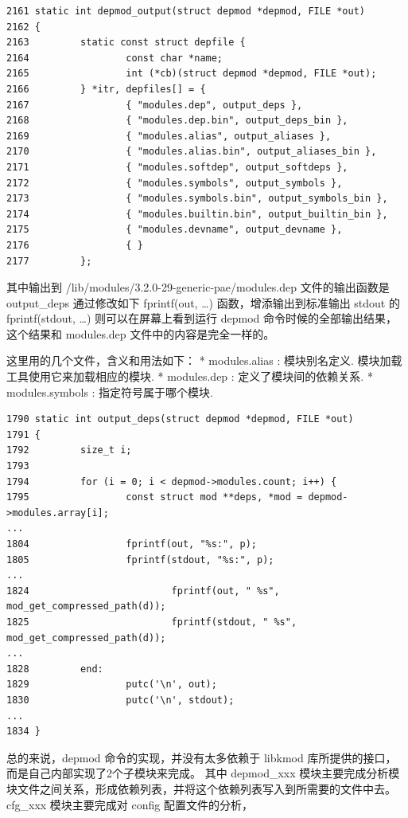 {\begin{shaded}\begin{verbatim}
2161 static int depmod_output(struct depmod *depmod, FILE *out)
2162 {
2163         static const struct depfile {
2164                 const char *name;
2165                 int (*cb)(struct depmod *depmod, FILE *out);
2166         } *itr, depfiles[] = {
2167                 { "modules.dep", output_deps },
2168                 { "modules.dep.bin", output_deps_bin },
2169                 { "modules.alias", output_aliases },
2170                 { "modules.alias.bin", output_aliases_bin },
2171                 { "modules.softdep", output_softdeps },
2172                 { "modules.symbols", output_symbols },
2173                 { "modules.symbols.bin", output_symbols_bin },
2174                 { "modules.builtin.bin", output_builtin_bin },
2175                 { "modules.devname", output_devname },
2176                 { }
2177         };
\end{verbatim}\end{shaded}}
其中输出到 /lib/modules/3.2.0-29-generic-pae/modules.dep
文件的输出函数是 output\_deps 通过修改如下 fprintf(out, \ldots{})
函数，增添输出到标准输出 stdout 的 fprintf(stdout, \ldots{})
则可以在屏幕上看到运行 depmod 命令时候的全部输出结果，这个结果和
modules.dep 文件中的内容是完全一样的。

这里用的几个文件，含义和用法如下： * modules.alias : 模块别名定义.
模块加载工具使用它来加载相应的模块. * modules.dep :
定义了模块间的依赖关系. * modules.symbols : 指定符号属于哪个模块.

{\begin{shaded}\begin{verbatim}
1790 static int output_deps(struct depmod *depmod, FILE *out)
1791 {
1792         size_t i;
1793 
1794         for (i = 0; i < depmod->modules.count; i++) {
1795                 const struct mod **deps, *mod = depmod->modules.array[i];
...
1804                 fprintf(out, "%s:", p);
1805                 fprintf(stdout, "%s:", p);
...
1824                         fprintf(out, " %s", mod_get_compressed_path(d));
1825                         fprintf(stdout, " %s", mod_get_compressed_path(d));
...
1828         end:
1829                 putc('\n', out);
1830                 putc('\n', stdout);
... 
1834 }
\end{verbatim}\end{shaded}}
总的来说，depmod 命令的实现，并没有太多依赖于 libkmod
库所提供的接口，而是自己内部实现了2个子模块来完成。 其中 depmod\_xxx
模块主要完成分析模块文件之间关系，形成依赖列表，并将这个依赖列表写入到所需要的文件中去。
cfg\_xxx 模块主要完成对 config 配置文件的分析，

